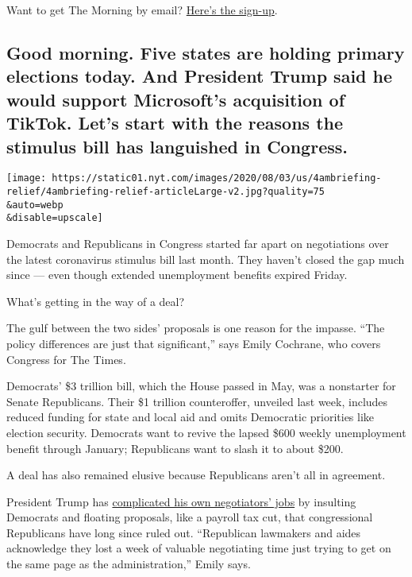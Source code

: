 Want to get The Morning by email?
\href{https://www.nytimes.com/newsletters/morning-briefing}{Here's the
sign-up}.

\hypertarget{good-morning-five-states-are-holding-primary-elections-today-and-president-trump-said-he-would-support-microsofts-acquisition-of-tiktok-lets-start-with-the-reasons-the-stimulus-bill-has-languished-in-congress}{%
\subsection{Good morning. Five states are holding primary elections
today. And President Trump said he would support Microsoft's acquisition
of TikTok. Let's start with the reasons the stimulus bill has languished
in
Congress.}\label{good-morning-five-states-are-holding-primary-elections-today-and-president-trump-said-he-would-support-microsofts-acquisition-of-tiktok-lets-start-with-the-reasons-the-stimulus-bill-has-languished-in-congress}}

\texttt{[image: https://static01.nyt.com/images/2020/08/03/us/4ambriefing-relief/4ambriefing-relief-articleLarge-v2.jpg?quality=75\\\&auto=webp\\\&disable=upscale]}

Democrats and Republicans in Congress started far apart on negotiations
over the latest coronavirus stimulus bill last month. They haven't
closed the gap much since --- even though extended unemployment benefits
expired Friday.

What's getting in the way of a deal?

The gulf between the two sides' proposals is one reason for the impasse.
``The policy differences are just that significant,'' says Emily
Cochrane, who covers Congress for The Times.

Democrats' \$3 trillion bill, which the House passed in May, was a
nonstarter for Senate Republicans. Their \$1 trillion counteroffer,
unveiled last week, includes reduced funding for state and local aid and
omits Democratic priorities like election security. Democrats want to
revive the lapsed \$600 weekly unemployment benefit through January;
Republicans want to slash it to about \$200.

A deal has also remained elusive because Republicans aren't all in
agreement.

President Trump has
\href{https://www.nytimes.com/2020/08/03/us/politics/congress-jobless-aid-talks-trump.html}{complicated
his own negotiators' jobs} by insulting Democrats and floating
proposals, like a payroll tax cut, that congressional Republicans have
long since ruled out. ``Republican lawmakers and aides acknowledge they
lost a week of valuable negotiating time just trying to get on the same
page as the administration,'' Emily says.

